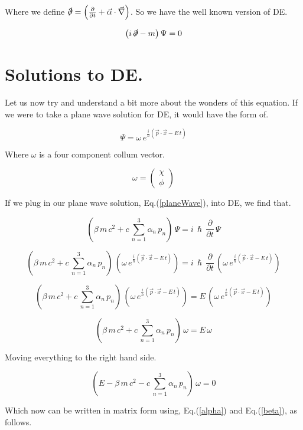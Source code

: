 \documentclass[a4page,12pt]{article}
\newcommand{\eqL}[2]{
	\begin{equation} \label{#1}
		#2
	\end{equation}
}
\begin{document}
	Where we define $\slashed{\partial}  = \left( \frac{\partial}{\partial t} + \vec{\alpha}\cdot \vec{\nabla}\right) $. So we have the well known version of DE.

		\eqL{diracEquation}{
			 \left( i\,\slashed{\partial}  - m \right) \Psi  = 0
		} 
	
\newpage

\section{Solutions to DE.}

	Let us now try and understand a bit more about the wonders of this equation. If we were to take a plane wave solution for DE, it would have the form of.

	\eqL{planeWave}{
		\Psi = \omega \, e^{\frac{i}{\hslash}\left(\vec{p}\cdot\vec{x} - E \, t\right)}
	}
	
	Where $\omega$ is a four component collum vector.

	\[
		\omega = 
		\begin{pmatrix}
			\chi \\
			\phi
		\end{pmatrix}
	\]

	If we plug in our plane wave solution, Eq.(\ref{planeWave}), into DE, we find that.
	
	\[
		\left(\beta\,m\,c^2 + c \, \sum_{n=1}^{3} \alpha_n\, p_n  \right)  \,\Psi  = i \, \hslash \, \frac{\partial}{\partial t} \, \Psi
	\]

	\[
		\left(\beta\,m\,c^2 + c \, \sum_{n=1}^{3} \alpha_n\, p_n  \right)  \,\left(\omega \, e^{\frac{i}{\hslash} \left(\vec{p}\cdot\vec{x} - E \, t\right)}\right)  = i \, \hslash \, \frac{\partial}{\partial t} \, \left(\omega \, e^{\frac{i}{\hslash} \left(\vec{p}\cdot\vec{x} - E \, t\right)}\right)
	\]

	\[
		\left(\beta\,m\,c^2 + c \, \sum_{n=1}^{3} \alpha_n\, p_n  \right)  \,\left(\omega \, e^{\frac{i}{\hslash} \left(\vec{p}\cdot\vec{x} - E \, t\right)}\right)  = E \, \left(\omega \, e^{\frac{i}{\hslash} \left(\vec{p}\cdot\vec{x} - E \, t\right)}\right)
	\]

	\[
		\left(\beta\,m\,c^2 + c \, \sum_{n=1}^{3} \alpha_n\, p_n  \right)  \, \omega = E \,\omega
	\]

	Moving everything to the right hand side.

	\[
		\left(E - \beta\,m\,c^2 - c \, \sum_{n=1}^{3} \alpha_n\, p_n  \right)  \, \omega = 0
	\]

	Which now can be written in matrix form using, Eq.(\ref{alpha}) and Eq.(\ref{beta}), as follows.
\end{document}
